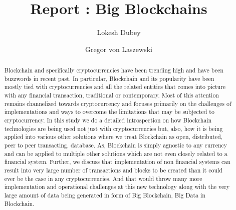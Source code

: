
\title{Report : Big Blockchains}


\author{Lokesh Dubey}

\renewcommand{\shortauthors}{L. Dubey}

\author{Gregor von Laszewski}


\renewcommand{\shortauthors}{G. v. Laszewski}


\begin{abstract}

Blockchain and specifically cryptocurrencies have been trending high and have been buzzwords in recent past. In particular, Blockchain and its popularity have been mostly tied with cryptocurrencies and all the related entities that comes into picture with any financial transaction, traditional or contemporary. Most of this attention remains channelized towards cryptocurrency and focuses primarily on the challenges of implementations and ways to overcome the limitations that may be subjected to cryptocurrency. In this study we do a detailed introspection on how Blockchain technologies are being used not just with  cryptocurrencies but, also, how it is being applied into various other solutions where we treat Blockchain as open, distributed, peer to peer transacting, database. As, Blockchain is simply agnostic to any currency and can be applied to multiple other solutions which are not even closely related to a financial system. Further, we discuss that implementation of non financial systems can result into very large number of transactions and blocks to be created than it could ever be the case in any cryptocurrencies. And that would throw many more implementation and operational challenges at this new technology along with the very large amount of data being generated in form of Big Blockchain, Big Data in Blockchain.

\end{abstract}


